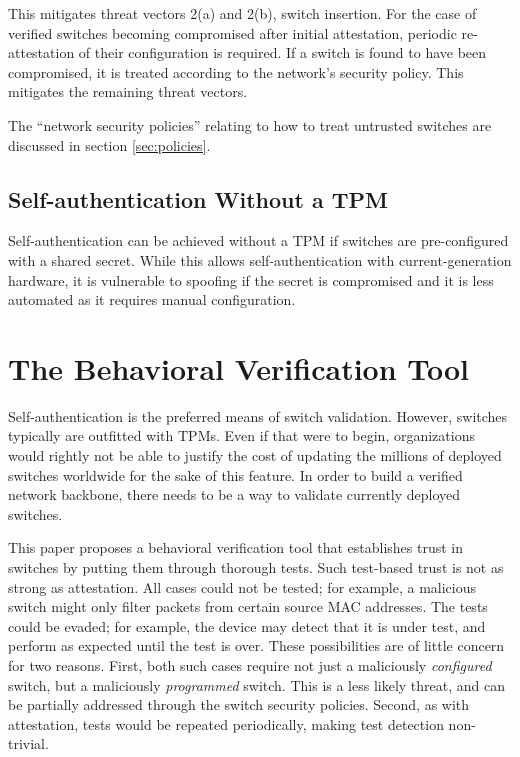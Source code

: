 \documentclass[journal]{IEEEtran}
\begin{document}
This mitigates threat vectors 2(a) and 2(b), switch insertion. For the case of verified switches
becoming compromised after initial attestation, periodic re-attestation of their configuration is
required. If a switch is found to have been compromised, it is treated according to the network's
security policy. This mitigates the remaining threat vectors.

The ``network security policies'' relating to how to treat untrusted switches are discussed in
section \ref{sec:policies}.

\subsection{Self-authentication Without a TPM}
Self-authentication can be achieved without a TPM if switches are pre-configured with a shared
secret. While this allows self-authentication with current-generation hardware, it is vulnerable
to spoofing if the secret is compromised and it is less automated as it requires manual
configuration.



\section{The Behavioral Verification Tool}
Self-authentication is the preferred means of switch validation. However, switches typically are
outfitted with TPMs. Even if that were to begin, organizations would rightly not be able to justify
the cost of updating the millions of deployed switches worldwide for the sake of this feature. In
order to build a verified network backbone, there needs to be a way to validate currently deployed
switches.

This paper proposes a behavioral verification tool that establishes trust in switches by putting
them through thorough tests. Such test-based trust is not as strong as attestation. All cases could
not be tested; for example, a malicious switch might only filter packets from certain source MAC
addresses. The tests could be evaded; for example, the device may detect that it is under test, and
perform as expected until the test is over. These possibilities are of little concern for two
reasons. First, both such cases require not just a maliciously \textit{configured} switch, but a
maliciously \textit{programmed} switch. This is a less likely threat, and can be partially
addressed through the switch security policies. Second, as with attestation, tests would be
repeated periodically, making test detection non-trivial.
\end{document}
